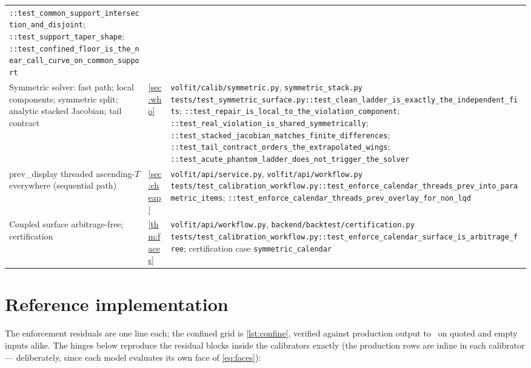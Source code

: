 \documentclass[11pt]{article}
\begin{document}
\begin{longtable}{@{}p{}p{}p{}@{}}
\nolinkurl{::test_common_support_intersection_and_disjoint};
\nolinkurl{::test_support_taper_shape};
\nolinkurl{::test_confined_floor_is_the_near_call_curve_on_common_support}\\
\addlinespace
Symmetric solver: fast path; local components; symmetric split;
analytic stacked Jacobian; tail contract &
\cref{sec:who} &
\nolinkurl{volfit/calib/symmetric.py},
\nolinkurl{symmetric_stack.py}\newline
\nolinkurl{tests/test_symmetric_surface.py::test_clean_ladder_is_exactly_the_independent_fits};
\nolinkurl{::test_repair_is_local_to_the_violation_component};
\nolinkurl{::test_real_violation_is_shared_symmetrically};
\nolinkurl{::test_stacked_jacobian_matches_finite_differences};
\nolinkurl{::test_tail_contract_orders_the_extrapolated_wings};
\nolinkurl{::test_acute_phantom_ladder_does_not_trigger_the_solver}\\
\addlinespace
prev\_display threaded ascending-$T$ everywhere (sequential path) &
\cref{sec:cheap} &
\nolinkurl{volfit/api/service.py},
\nolinkurl{volfit/api/workflow.py}\newline
\nolinkurl{tests/test_calibration_workflow.py::test_enforce_calendar_threads_prev_into_parametric_items};
\nolinkurl{::test_enforce_calendar_threads_prev_overlay_for_non_lqd}\\
\addlinespace
Coupled surface arbitrage-free; certification &
\cref{thm:faces} &
\nolinkurl{volfit/api/workflow.py},
\nolinkurl{backend/backtest/certification.py}\newline
\nolinkurl{tests/test_calibration_workflow.py::test_enforce_calendar_surface_is_arbitrage_free};
certification case \texttt{symmetric\_calendar}\\
\bottomrule
\end{longtable}
\endgroup

\section{Reference implementation}
\label{app:ref}

The enforcement residuals are one line each; the confined grid is
\cref{lst:confine}, verified against production output to
\calmrefagree\ on quoted and empty inputs alike.  The hinges below
reproduce the residual blocks inside the calibrators exactly (the
production rows are inline in each calibrator --- deliberately, since
each model evaluates its own face of \eqref{eq:faces}):
\end{document}

